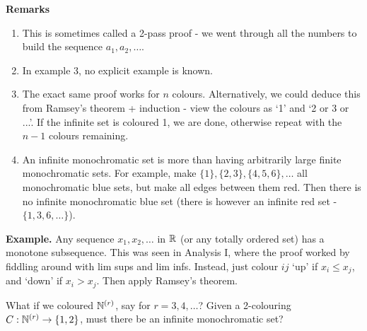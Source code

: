 \documentclass[10pt,a4paper]{article}
\begin{document}
\textbf{Remarks}
\begin{enumerate}
  \item This is sometimes called a 2-pass proof - we went through all the numbers to build the sequence $a_1, a_2, \ldots$.
  \item In example 3, no explicit example is known.
  \item The exact same proof works for $n$ colours. Alternatively, we could deduce this from Ramsey's theorem + induction - view the colours as `1' and `2 or 3 or ...'. If the infinite set is coloured 1, we are done, otherwise repeat with the $n-1$ colours remaining.
  \item An infinite monochromatic set is more than having arbitrarily large finite monochromatic sets. For example, make $\{1\}, \{2,3\}, \{4,5,6\}, \ldots$ all monochromatic blue sets, but make all edges between them red. Then there is no infinite monochromatic blue set (there is however an infinite red set - $\{1,3,6,\ldots\}$).
\end{enumerate}

\textbf{Example.}
Any sequence $x_1, x_2, \ldots$ in $\mathbb{R}$ (or any totally ordered set) has a monotone subsequence. This was seen in Analysis I, where the proof worked by fiddling around with lim sups and lim infs. Instead, just colour $ij$ `up' if $x_i \leq x_j$, and `down' if $x_i>x_j$. Then apply Ramsey's theorem.

What if we coloured $\mathbb{N}^{(r)}$, say for $r = 3,4,\ldots$? Given a 2-colouring $C:\mathbb{N}^{(r)}\to \{1,2\}$, must there be an infinite monochromatic set?
\end{document}
